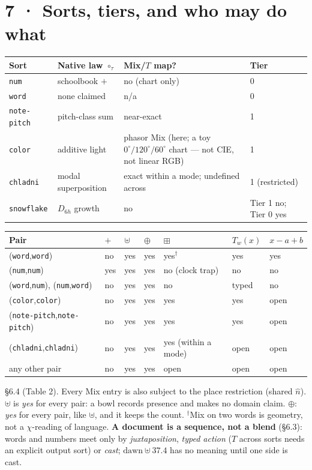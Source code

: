 \documentclass[10.5pt]{article}
\begin{document}
\section*{7 · Sorts, tiers, and who may do what}
{\small\setlength{\tabcolsep}{4pt}\begin{longtable}{L{2.4cm}L{3.4cm}L{7.2cm}L{3.0cm}}
\toprule
\textbf{Sort} & \textbf{Native law $\circ_\tau$} & \textbf{Mix/$T$ map?} & \textbf{Tier} \\
\midrule
\endhead
\texttt{num} & schoolbook $+$ & no (chart only) & 0 \\
\texttt{word} & none claimed & n/a & 0 \\
\texttt{note-pitch} & pitch-class sum & near-exact & 1 \\
\texttt{color} & additive light & phasor Mix (here; a toy $0^\circ/120^\circ/60^\circ$ chart — not CIE, not linear RGB) & 1 \\
\texttt{chladni} & modal superposition & exact within a mode; undefined across & 1 (restricted) \\
\texttt{snowflake} & $D_{6h}$ growth & no & Tier 1 no; Tier 0 yes \\
\bottomrule
\end{longtable}}
{\small\setlength{\tabcolsep}{4pt}\begin{longtable}{L{4.6cm}L{0.9cm}L{1.0cm}L{1.0cm}L{2.8cm}L{2.0cm}L{2.0cm}}
\toprule
\textbf{Pair} & \textbf{$+$} & \textbf{$\uplus$} & \textbf{$\oplus$} & \textbf{$\boxplus$} & \textbf{$T_w(x)$} & \textbf{$x-a+b$} \\
\midrule
\endhead
(\texttt{word},\texttt{word}) & no & yes & yes & yes$^\dagger$ & yes & yes \\
(\texttt{num},\texttt{num}) & yes & yes & yes & no (clock trap) & no & no \\
(\texttt{word},\texttt{num}), (\texttt{num},\texttt{word}) & no & yes & yes & no & typed & no \\
(\texttt{color},\texttt{color}) & no & yes & yes & yes & yes & open \\
(\texttt{note-pitch},\texttt{note-pitch}) & no & yes & yes & yes & yes & open \\
(\texttt{chladni},\texttt{chladni}) & no & yes & yes & yes (within a mode) & open & open \\
any other pair & no & yes & yes & open & open & open \\
\bottomrule
\end{longtable}}
§6.4 (Table 2). Every Mix entry is also subject to the place restriction (shared $\hat n$). $\uplus$ is \emph{yes} for every pair: a bowl records presence and makes no domain claim. $\oplus$: \emph{yes} for every pair, like $\uplus$, and it keeps the count. $^\dagger$Mix on two words is geometry, not a $\chi$-reading of language. \textbf{A document is a sequence, not a blend} (§6.3): words and numbers meet only by \emph{juxtaposition}, \emph{typed action} ($T$ across sorts needs an explicit output sort) or \emph{cast}; $\mathrm{dawn}\uplus37.4$ has no meaning until one side is cast.
\end{document}
